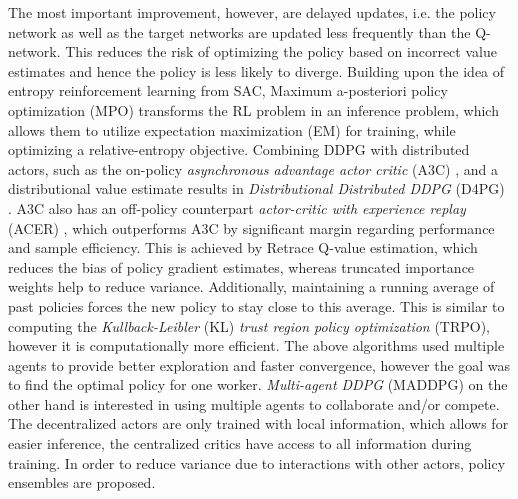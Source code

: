 	The most important improvement, however, are delayed updates, i.e. the policy network as well as the target networks are updated less frequently than the Q-network.
	This reduces the risk of optimizing the policy based on incorrect value estimates and hence the policy is less likely to diverge.	
	Building upon the idea of entropy reinforcement learning from SAC, Maximum a-posteriori policy optimization (MPO) \cite{Abdolmaleki2018} transforms the RL problem in an inference problem, which allows them to utilize expectation maximization (EM) for training, while optimizing a relative-entropy objective.
	Combining DDPG with distributed actors, such as the on-policy \textit{asynchronous advantage actor critic} (A3C) \cite{Mnih2016}, and a distributional value estimate \cite{Bellemare2017} results in \textit{Distributional Distributed DDPG} (D4PG) \cite{Barth-Maron2018}.
	A3C also has an off-policy counterpart \textit{actor-critic with experience replay} (ACER) \cite{Wang2017}, which outperforms A3C by significant margin regarding performance and sample efficiency. 
	This is achieved by Retrace \cite{Munos2016} Q-value estimation, which reduces the bias of policy gradient estimates, whereas truncated importance weights help to reduce variance.
	Additionally, maintaining a running average of past policies forces the new policy to stay close to this average.
	This is similar to computing the \textit{Kullback-Leibler} (KL) \textit{trust region policy optimization} (TRPO), however it is computationally more efficient.
	The above algorithms used multiple agents to provide better exploration and faster convergence, however the goal was to find the optimal policy for one worker. 
	\textit{Multi-agent DDPG} (MADDPG) \cite{Lowe2017} on the other hand is interested in using multiple agents to collaborate and/or compete. 
	The decentralized actors are only trained with local information, which allows for easier inference, the centralized critics have access to all information during training. 
	In order to reduce variance due to interactions with other actors, policy ensembles are proposed. 
		
